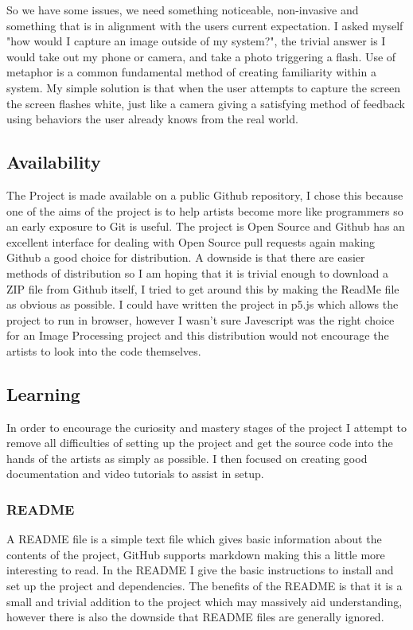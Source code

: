 \documentclass[a4paper]{report}
\begin{document}
So we have some issues, we need something noticeable, non-invasive and something that is in alignment with the users current expectation. I asked myself "how would I capture an image outside of my system?", the trivial answer is I would take out my phone or camera, and take a photo triggering a flash. Use of metaphor is a common fundamental method of creating familiarity within a system. My simple solution is that when the user attempts to capture the screen the screen flashes white, just like a camera giving a satisfying method of feedback using behaviors the user already knows from the real world. 

\subsection{Availability}
The Project is made available on a public Github repository\cite{GITHUB}, I chose this because one of the aims of the project is to help artists become more like programmers so an early exposure to Git is useful. The project is Open Source and Github has an excellent interface for dealing with Open Source pull requests again making Github a good choice for distribution. A downside is that there are easier methods of distribution so I am hoping that it is trivial enough to download a ZIP file from Github itself, I tried to get around this by making the ReadMe file as obvious as possible. I could have written the project in p5.js which allows the project to run in browser, however I wasn't sure Javescript was the right choice for an Image Processing project and this distribution would not encourage the artists to look into the code themselves.

\subsection{Learning}
In order to encourage the curiosity and mastery stages of the project I attempt to remove all difficulties of setting up the project and get the source code into the hands of the artists as simply as possible. I then focused on creating good documentation and video tutorials to assist in setup.

\subsubsection{README}
A README file is a simple text file which gives basic information about the contents of the project, GitHub supports markdown making this a little more interesting to read. In the README I give the basic instructions to install and set up the project and dependencies. The benefits of the README is that it is a small and trivial addition to the project which may massively aid understanding, however there is also the downside that README files are generally ignored.
\end{document}
